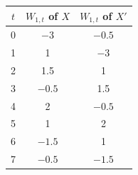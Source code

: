 \begin{tabular}{ccc}
\toprule
$t$ & $W_{1,t}$ of $X$ & $W_{1,t}$ of $X'$ \\
\midrule
0 & $-3$ & $-0.5$ \\
1 & 1 & $-3$ \\
2 & 1.5 & 1 \\
3 & $-0.5$ & 1.5 \\
4 & 2 & $-0.5$ \\
5 & 1 & 2 \\
6 & $-1.5$ & 1 \\
7 & $-0.5$ & $-1.5$ \\
\bottomrule
\end{tabular}